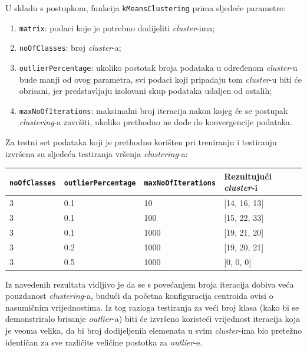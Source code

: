 \documentclass[12pt,a4paper]{article}
\begin{document}
U skladu s postupkom, funkcija \texttt{kMeansClustering} prima sljedeće parametre:

\begin{enumerate}

\item \texttt{matrix}: podaci koje je potrebno dodijeliti \textit{cluster}-ima;
\item \texttt{noOfClasses}: broj \textit{cluster}-a;
\item \texttt{outlierPercentage}: ukoliko postotak broja podataka u određenom \textit{cluster}-u bude manji od ovog parametra, svi podaci koji pripadaju tom \textit{cluster}-u biti će obrisani, jer predstavljaju izolovani skup podataka udaljen od ostalih;
\item \texttt{maxNoOfIterations}: maksimalni broj iteracija nakon kojeg će se postupak \textit{clustering}-a završiti, ukoliko prethodno ne dođe do konvergencije podataka. 

\end{enumerate}

Za testni set podataka koji je prethodno korišten pri treniranju i testiranju izvršena su sljedeća testiranja vršenja \textit{clustering}-a:

\begin{table}[H]
\centering
\begin{tabular}{|l|l|l|l|l|}
\hline
\textbf{\texttt{noOfClasses}} 		& \textbf{\texttt{outlierPercentage}}   	& \textbf{ \texttt{maxNoOfIterations}} 		& \textbf{Rezultujući \textit{cluster}-i} 		\\ \hline
3            						& 0.1 								& 10              							& [14, 16, 13]            				   	\\ \hline
3            						& 0.1 								& 100              							& [15, 22, 33]          				   		\\ \hline
3            						& 0.1 								& 1000              							& [19, 21, 20]          				   		\\ \hline
3           						& 0.2 								& 1000             							& [19, 20, 21]          					 	\\ \hline
3           						& 0.5 								& 1000             							& [0, 0, 0]              					 	\\ \hline
\end{tabular}
\end{table}

\newpage

Iz navedenih rezultata vidljivo je da se s povećanjem broja iteracija dobiva veća pouzdanost \textit{clustering}-a, budući da početna konfiguracija centroida ovisi o nasumičnim vrijednostima. Iz tog razloga testiranja za veći broj klasa (kako bi se demonstriralo brisanje \textit{outlier}-a) biti će izvršeno koristeći vrijednost iteracija koja je veoma velika, da bi broj dodijeljenih elemenata u svim \textit{cluster}-ima bio pretežno identičan za sve različite veličine postotka za \textit{outlier}-e.
\end{document}
